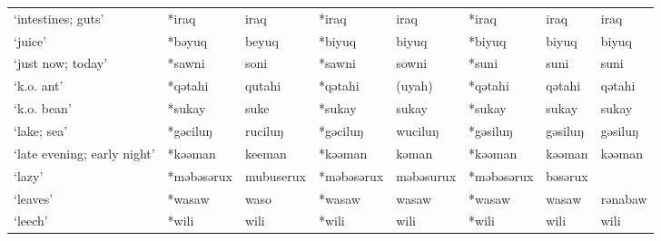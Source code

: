 \begin{landscape}
\begin{longtable}[c]{@{}p{3cm}<{\raggedright}p{2.75cm}<{\raggedright}p{2.75cm}<{\raggedright}p{2.75cm}<{\raggedright}p{2.75cm}<{\raggedright}p{2.75cm}<{\raggedright}p{2.75cm}<{\raggedright}p{2.75cm}<{\raggedright}@{}}
`intestines; guts'                                   & *iraq              & iraq                           & *iraq              & iraq                       & *iraq            & iraq                     & iraq                              \\
`juice'                                              & *bəyuq             & beyuq                          & *biyuq             & biyuq                      & *biyuq           & biyuq                    & biyuq                             \\
`just now; today'                                    & *sawni             & soni                           & *sawni             & sowni                      & *suni            & suni                     & suni                              \\
`k.o. ant'                                           & *qətahi            & qutahi                         & *qətahi            & (uyah)                     & *qətahi          & qətahi                   & qətahi                            \\
`k.o. bean'                                          & *sukay             & suke                           & *sukay             & sukay                      & *sukay           & sukay                    & sukay                             \\
`lake; sea'                                          & *gəciluŋ           & ruciluŋ                        & *gəciluŋ           & wuciluŋ                    & *gəsiluŋ         & gəsiluŋ                  & gəsiluŋ                           \\
`late evening; early night'                          & *kəəman            & keeman                         & *kəəman            & kəman                      & *kəəman          & kəəman                   & kəəman                            \\
`lazy'                                               & *məbəsərux         & mubuserux                      & *məbəsərux         & məbəsurux                  & *məbəsərux       & bəsərux                  &                                   \\
`leaves'                                             & *wasaw             & waso                           & *wasaw             & wasaw                      & *wasaw           & wasaw                    & rənabaw                           \\
`leech'                                              & *wili              & wili                           & *wili              & wili                       & *wili            & wili                     & wili                              \\

\end{longtable}
\end{landscape}

